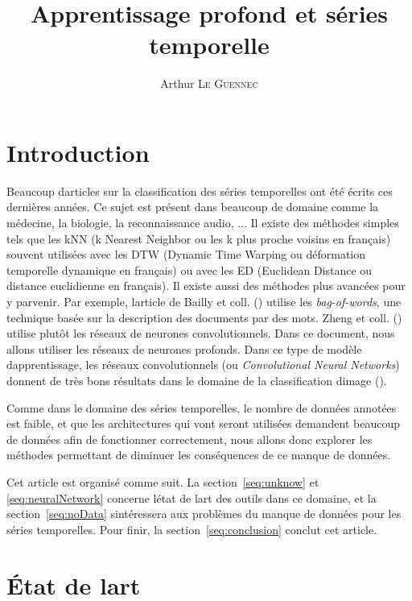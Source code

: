 \documentclass[11pt,final,ENIB]{sdm}
\title{Apprentissage profond et s\'eries temporelle}
\author{Arthur \textsc{Le Guennec}}
\begin{document}
\maketitle


\section{Introduction}

Beaucoup d\textquotesingle articles sur la classification des s\'eries temporelles ont \'et\'e \'ecrits ces derni\`eres ann\'ees. Ce sujet est pr\'esent dans beaucoup de domaine comme la m\'edecine, la biologie, la reconnaissance audio, ... 
Il existe des m\'ethodes simples tels que les kNN (k Nearest Neighbor ou les k plus proche voisins en fran\c cais) souvent utilis\'ees avec les DTW (Dynamic Time Warping ou d\'eformation temporelle dynamique en fran\c cais) ou avec les ED (Euclidean Distance ou distance euclidienne en fran\c cais).
Il existe aussi des m\'ethodes plus avanc\'ees pour y parvenir. Par exemple, l\textquotesingle article de Bailly et coll. (\cite{bailly2015bag}) utilise les \textit{bag-of-words}, une technique bas\'ee sur la description des documents par des mots. Zheng et coll. (\cite{zheng2014time}) utilise plut\^ot les r\'eseaux de neurones convolutionnels.
Dans ce document, nous allons utiliser les r\'eseaux de neurones profonds. Dans ce type de mod\`ele d\textquotesingle apprentissage, les r\'eseaux convolutionnels (ou \textit{Convolutional Neural Networks}) donnent de tr\`es bons r\'esultats dans le domaine de la classification d\textquotesingle image (\cite{chatfield2014return}).

Comme dans le domaine des s\'eries temporelles, le nombre de donn\'ees annot\'ees est faible, et que les architectures qui vont seront utilis\'ees demandent beaucoup de donn\'ees afin de fonctionner correctement, nous allons donc explorer les m\'ethodes permettant de diminuer les cons\'equences de ce manque de donn\'ees.

Cet article est organis\'e comme suit. La section~\ref{seq:unknow} et \ref{seq:neuralNetwork} concerne l\textquotesingle \'etat de l\textquotesingle art des outils dans ce domaine, et la section~\ref{seq:noData} s\textquotesingle int\'eressera aux probl\`emes du manque de donn\'ees pour les s\'eries temporelles. Pour finir, la section~\ref{seq:conclusion} conclut cet article.
 

\section{\'Etat de l\textquotesingle art}
\label{seq:stateOfTheArt}
\end{document}
